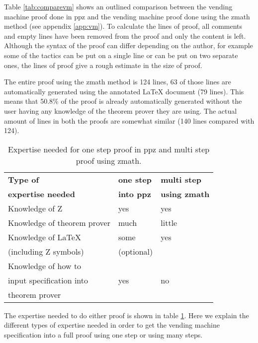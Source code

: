 Table \ref{tab:comparevm} shows an outlined comparison between the vending machine proof done in \gls{ppz} \cite{pp} and the vending machine proof done using the \gls{zmath} method (see appendix \ref{app:vm}). To calculate the lines of proof, all comments and empty lines have been removed from the proof and only the content is left. Although the syntax of the proof can differ depending on the author, for example some of the tactics can be put on a single line or can be put on two separate ones, the lines of proof give a rough estimate in the size of  proof.

The entire proof using the \gls{zmath} method is 124 lines, 63 of those lines are automatically generated using the annotated \LaTeX{} document (79 lines). This means that 50.8\% of the proof is already automatically generated without the user having any knowledge of the theorem prover they are using. The actual amount of lines in both the proofs are somewhat similar (140 lines compared with 124).

\begin{table}[H]
\begin{center}
\begin{tabular}{| l | l | l |}
\hline
\textbf{Type of} & \textbf{one step} & \textbf{multi step} \\
\textbf{expertise needed} & \textbf{into \gls{ppz}} & \textbf{using \gls{zmath}} \\
\hline
\hline
Knowledge of Z &  yes & yes \\
\hline
Knowledge of theorem prover & much & little \\
\hline
Knowledge of \LaTeX & some & yes \\
(including Z symbols) & (optional) & \\
\hline
Knowledge of how to & & \\
input specification into & yes & no \\
theorem prover & & \\
\hline
\end{tabular}
\end{center}
\caption{Expertise needed for one step proof in \gls{ppz} and multi step proof using \gls{zmath}.}
\label{tab:expertise}
\end{table}

The expertise needed to do either proof is shown in table \ref{tab:expertise}. Here we explain the different types of expertise needed in order to get the vending machine specification into a full proof using one step or using many steps.

